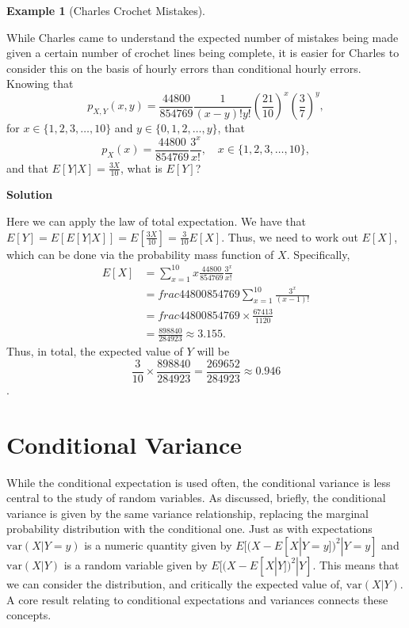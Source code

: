 \documentclass[
  letterpaper,
  DIV=11,
  numbers=noendperiod]{scrreprt}
\theoremstyle{definition}
\theoremstyle{definition}
\newtheorem{example}{Example}[chapter]
\theoremstyle{definition}
\theoremstyle{remark}
\begin{document}
\begin{example}[Charles Crochet
Mistakes]\protect\hypertarget{exm-law-of-total-expectation}{}\label{exm-law-of-total-expectation}

While Charles came to understand the expected number of mistakes being
made given a certain number of crochet lines being complete, it is
easier for Charles to consider this on the basis of hourly errors than
conditional hourly errors. Knowing that
\[p_{X,Y}(x,y) = \frac{44800}{854769} \frac{1}{(x-y)!y!} \left(\frac{21}{10}\right)^x\left(\frac{3}{7}\right)^{y}, \]
for \(x \in \{1,2,3,\dots,10\}\) and \(y \in\{0,1,2,\dots,y\}\), that
\[p_X(x) = \frac{44800}{854769} \frac{3^x}{x!}, \quad x\in\{1,2,3,\dots,10\},\]
and that \(E[Y|X] = \frac{3X}{10}\), what is \(E[Y]\)?

\begin{tcolorbox}[enhanced jigsaw, colback=white, colframe=quarto-callout-color-frame, arc=.35mm, leftrule=.75mm, rightrule=.15mm, opacityback=0, breakable, bottomrule=.15mm, left=2mm, toprule=.15mm]

\vspace{-3mm}\textbf{Solution}\vspace{3mm}

Here we can apply the law of total expectation. We have that
\(E[Y] = E[E[Y|X]] = E\left[\frac{3X}{10}\right] = \frac{3}{10}E[X]\).
Thus, we need to work out \(E[X]\), which can be done via the
probability mass function of \(X\). Specifically, \begin{align*}
E[X] &= \sum_{x=1}^{10} x\frac{44800}{854769} \frac{3^x}{x!} \\
&= frac{44800}{854769} \sum_{x=1}^{10} \frac{3^x}{(x-1)!} \\
&= frac{44800}{854769}\times\frac{67413}{1120} \\
&= \frac{898840}{284923} \approx 3.155. 
\end{align*} Thus, in total, the expected value of \(Y\) will be
\[\frac{3}{10}\times\frac{898840}{284923} = \frac{269652}{284923} \approx 0.946\].

\end{tcolorbox}

\end{example}

\section{Conditional Variance}\label{conditional-variance}

While the conditional expectation is used often, the conditional
variance is less central to the study of random variables. As discussed,
briefly, the conditional variance is given by the same variance
relationship, replacing the marginal probability distribution with the
conditional one. Just as with expectations \(\text{var}(X|Y=y)\) is a
numeric quantity given by \(E[(X-E[X|Y=y])^2|Y=y]\) and
\(\text{var}(X|Y)\) is a random variable given by \(E[(X-E[X|Y])^2|Y]\).
This means that we can consider the distribution, and critically the
expected value of, \(\text{var}(X|Y)\). A core result relating to
conditional expectations and variances connects these concepts.
\end{document}
